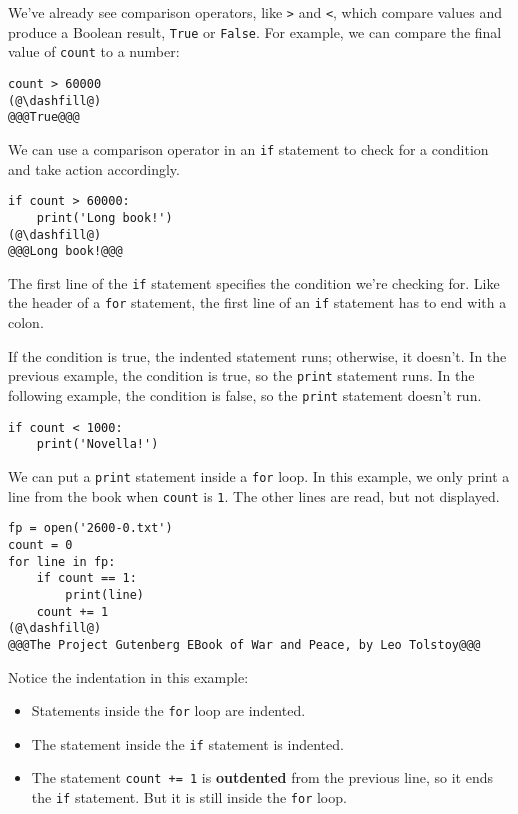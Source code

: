 We've already see comparison operators, like \passthrough{\lstinline!>!}
and \passthrough{\lstinline!<!}, which compare values and produce a
Boolean result, \passthrough{\lstinline!True!} or
\passthrough{\lstinline!False!}. For example, we can compare the final
value of \passthrough{\lstinline!count!} to a number:

\begin{lstlisting}[]
count > 60000
(@\dashfill@)
@@@True@@@
\end{lstlisting}

We can use a comparison operator in an \passthrough{\lstinline!if!}
statement to check for a condition and take action accordingly.

\begin{lstlisting}[]
if count > 60000:
    print('Long book!')
(@\dashfill@)
@@@Long book!@@@
\end{lstlisting}

The first line of the \passthrough{\lstinline!if!} statement specifies
the condition we're checking for. Like the header of a
\passthrough{\lstinline!for!} statement, the first line of an
\passthrough{\lstinline!if!} statement has to end with a colon.

If the condition is true, the indented statement runs; otherwise, it
doesn't. In the previous example, the condition is true, so the
\passthrough{\lstinline!print!} statement runs. In the following
example, the condition is false, so the \passthrough{\lstinline!print!}
statement doesn't run.

\begin{lstlisting}[]
if count < 1000:
    print('Novella!')
\end{lstlisting}

We can put a \passthrough{\lstinline!print!} statement inside a
\passthrough{\lstinline!for!} loop. In this example, we only print a
line from the book when \passthrough{\lstinline!count!} is
\passthrough{\lstinline!1!}. The other lines are read, but not
displayed.

\begin{lstlisting}[]
fp = open('2600-0.txt')
count = 0
for line in fp:
    if count == 1:
        print(line)
    count += 1
(@\dashfill@)
@@@The Project Gutenberg EBook of War and Peace, by Leo Tolstoy@@@
\end{lstlisting}

Notice the indentation in this example:

\begin{itemize}
\item
  Statements inside the \passthrough{\lstinline!for!} loop are indented.
\item
  The statement inside the \passthrough{\lstinline!if!} statement is
  indented.
\item
  The statement \passthrough{\lstinline!count += 1!} is
  \textbf{outdented} from the previous line, so it ends the
  \passthrough{\lstinline!if!} statement. But it is still inside the
  \passthrough{\lstinline!for!} loop.
\end{itemize}

